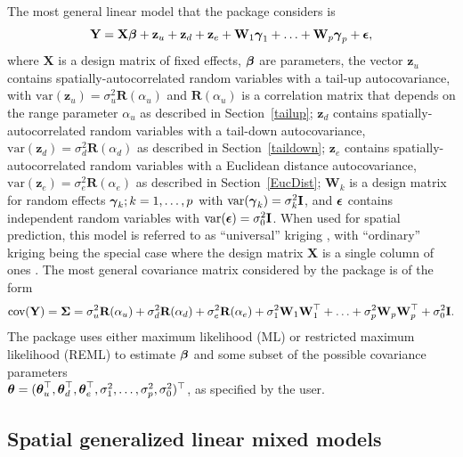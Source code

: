 \documentclass[nojss]{jss}
\def\btheta{\mbox{\boldmath $\theta$}}
\def\bbeta{\mbox{\boldmath $\beta$}}
\def\bgamma{\mbox{\boldmath $\gamma$}}
\def\bepsilon{\mbox{\boldmath $\epsilon$}}
\def\bSigma{\mbox{\boldmath $\Sigma$}}
\def\bY{\textbf{Y}}
\def\bX{\textbf{X}}
\def\bR{\textbf{R}}
\def\bz{\textbf{z}}
\def\bW{\textbf{W}}
\def\bI{\textbf{I}}
\def\var{\textrm{var}}
\def\cov{\textrm{cov}}
\begin{document}
The most general linear model that the  package considers is
\begin{equation} \label{eq:spLinearModel}
\bY = \bX\bbeta + \bz_u + \bz_d +\bz_e + \bW_1\bgamma_1 + \ldots
+ \bW_p\bgamma_p + \bepsilon,
\end{equation}
where $\bX$ is a design matrix of fixed effects, $\bbeta$ are
parameters, the vector $\bz_u$ contains spatially-autocorrelated
random variables with a tail-up autocovariance, with $\var(\bz_u) =
\sigma_u^2\bR(\alpha_u)$ and $\bR(\alpha_u)$ is a correlation matrix
that depends on the range parameter $\alpha_u$ as described in
Section~\ref{tailup}; $\bz_d$ contains spatially-autocorrelated random
variables with a tail-down autocovariance, $\var(\bz_d) =
\sigma_d^2\bR(\alpha_d)$ as described in Section~\ref{taildown};
$\bz_e$ contains spatially-autocorrelated random variables with a
Euclidean distance autocovariance, $\var(\bz_e) =
\sigma_e^2\bR(\alpha_e)$ as described in Section~\ref{EucDist};
$\bW_k$ is a design matrix for random effects $\bgamma_k; k =
1,\ldots,p$ with $\var(\bgamma_k)=\sigma^2_k\bI$, and $\bepsilon$
contains independent random variables with
$\var(\bepsilon)=\sigma^2_0\bI$.  When used for spatial prediction,
this model is referred to as ``universal'' kriging
\citep*[p. 107]{Le:Zide:stat:2006} , with ``ordinary'' kriging being
the special case where the design matrix \textbf{X} is a single column
of ones \citep[p. 119]{Cres:stat:1993}. The most general covariance
matrix considered by the  package is of the form
\begin{equation} \label{eq:covStructure}
\cov(\bY)=\bSigma=\sigma_u^2\bR(\alpha_u) + \sigma_d^2\bR(\alpha_d) +
\sigma_e^2\bR(\alpha_e) + \sigma_1^2\bW_1\bW_1^\top + \ldots +
\sigma_p^2\bW_p\bW_p^\top + \sigma_0^2\bI.  \end{equation} The
 package uses either maximum likelihood (ML) or restricted
maximum likelihood (REML) to estimate $\bbeta$ and some subset of the
possible covariance parameters \\
$\btheta=(\btheta_u^\top,\btheta_d^\top, \btheta_e^\top, \sigma^2_1,
\ldots, \sigma^2_p, \sigma^2_0)^\top$, as specified by the user.


\subsection{Spatial generalized linear mixed models}\label{SpGenLinMixMod}
\end{document}
